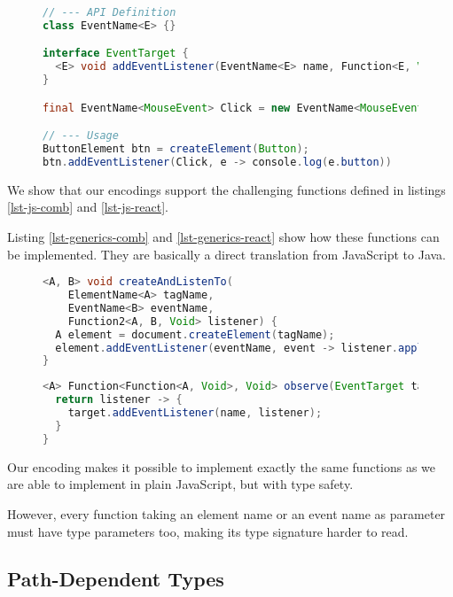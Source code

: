 \documentclass{llncs}
\begin{document}
\begin{figure}
\begin{lstlisting}[label=lst-generics-events,language=java]
// --- API Definition
class EventName<E> {}

interface EventTarget {
  <E> void addEventListener(EventName<E> name, Function<E, Void> callback);
}

final EventName<MouseEvent> Click = new EventName<MouseEvent>();

// --- Usage
ButtonElement btn = createElement(Button);
btn.addEventListener(Click, e -> console.log(e.button))
\end{lstlisting}
\end{figure}


We show that our encodings support the challenging functions defined in listings \ref{lst-js-comb} and \ref{lst-js-react}.

Listing \ref{lst-generics-comb} and \ref{lst-generics-react} show how these functions can be implemented. They are basically a direct translation from JavaScript to Java.

\begin{figure}
\begin{lstlisting}[label=lst-generics-comb,language=java]
<A, B> void createAndListenTo(
    ElementName<A> tagName,
    EventName<B> eventName,
    Function2<A, B, Void> listener) {
  A element = document.createElement(tagName);
  element.addEventListener(eventName, event -> listener.apply(event, element));
}
\end{lstlisting}
\end{figure}

\begin{figure}
\begin{lstlisting}[label=lst-generics-react,language=java]
<A> Function<Function<A, Void>, Void> observe(EventTarget target, EventName<A> name) {
  return listener -> {
    target.addEventListener(name, listener);
  }
}
\end{lstlisting}
\end{figure}

Our encoding makes it possible to implement exactly the same functions as we are able to implement in plain JavaScript, but with type safety.

However, every function taking an element name or an event name as parameter must have type parameters too, making its type signature harder to read.

\subsection{Path-Dependent Types}
\end{document}
